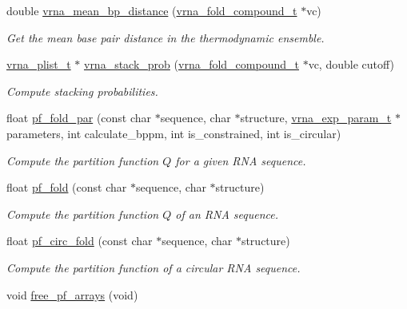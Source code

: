 \begin{DoxyCompactItemize}
double \hyperlink{group__pf__fold_gaa6b8983b559b9ef4b2e1b31113ea317b}{vrna\+\_\+mean\+\_\+bp\+\_\+distance} (\hyperlink{group__fold__compound_ga1b0cef17fd40466cef5968eaeeff6166}{vrna\+\_\+fold\+\_\+compound\+\_\+t} $\ast$vc)
\begin{DoxyCompactList}\small\item\em Get the mean base pair distance in the thermodynamic ensemble. \end{DoxyCompactList}\item 
\hyperlink{group__data__structures_ga8e4eb5e1bfc95776559575beb359af87}{vrna\+\_\+plist\+\_\+t} $\ast$ \hyperlink{group__pf__fold_ga26e3cc2eb127a35625572e9275c24ee4}{vrna\+\_\+stack\+\_\+prob} (\hyperlink{group__fold__compound_ga1b0cef17fd40466cef5968eaeeff6166}{vrna\+\_\+fold\+\_\+compound\+\_\+t} $\ast$vc, double cutoff)
\begin{DoxyCompactList}\small\item\em Compute stacking probabilities. \end{DoxyCompactList}\item 
float \hyperlink{group__pf__fold_gac4f95bee734b2563a3d6e9932117ebdf}{pf\+\_\+fold\+\_\+par} (const char $\ast$sequence, char $\ast$structure, \hyperlink{group__energy__parameters_ga01d8b92fe734df8d79a6169482c7d8d8}{vrna\+\_\+exp\+\_\+param\+\_\+t} $\ast$parameters, int calculate\+\_\+bppm, int is\+\_\+constrained, int is\+\_\+circular)
\begin{DoxyCompactList}\small\item\em Compute the partition function $Q$ for a given R\+N\+A sequence. \end{DoxyCompactList}\item 
float \hyperlink{group__pf__fold_gadc3db3d98742427e7001a7fd36ef28c2}{pf\+\_\+fold} (const char $\ast$sequence, char $\ast$structure)
\begin{DoxyCompactList}\small\item\em Compute the partition function $Q$ of an R\+N\+A sequence. \end{DoxyCompactList}\item 
float \hyperlink{group__pf__fold_ga819ce5fca8984004ac81c4a3b04cb735}{pf\+\_\+circ\+\_\+fold} (const char $\ast$sequence, char $\ast$structure)
\begin{DoxyCompactList}\small\item\em Compute the partition function of a circular R\+N\+A sequence. \end{DoxyCompactList}\item 
void \hyperlink{group__pf__fold_gae73db3f49a94f0f72e067ecd12681dbd}{free\+\_\+pf\+\_\+arrays} (void)

\end{DoxyCompactItemize}
